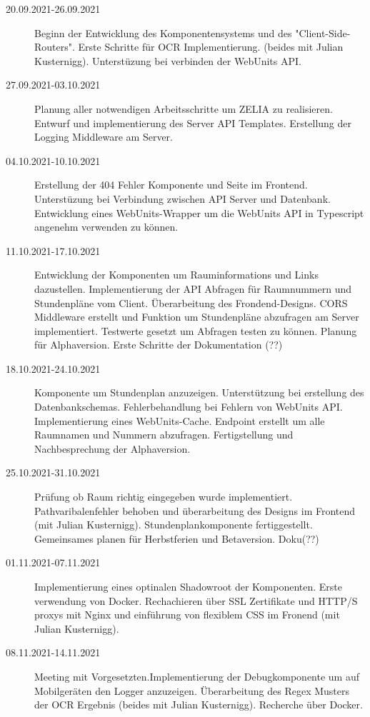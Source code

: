 
\begin{description}
    \item[20.09.2021-26.09.2021] Beginn der Entwicklung des Komponentensystems und des "Client-Side-Routers". Erste Schritte für OCR Implementierung. (beides mit Julian Kusternigg). Unterstüzung bei verbinden der WebUnits API.
    \item[27.09.2021-03.10.2021] Planung aller notwendigen Arbeitsschritte um ZELIA zu realisieren. Entwurf und implementierung des Server API Templates. Erstellung der Logging Middleware am Server.
    \item[04.10.2021-10.10.2021] Erstellung der 404 Fehler Komponente und Seite im Frontend. Unterstüzung bei Verbindung zwischen API Server und Datenbank. Entwicklung eines WebUnits-Wrapper um die WebUnits API in Typescript angenehm verwenden zu können.
    \item[11.10.2021-17.10.2021] Entwicklung der Komponenten um Rauminformations und Links dazustellen. Implementierung der API Abfragen für Raumnummern und Stundenpläne vom Client. Überarbeitung des Frondend-Designs. CORS Middleware erstellt und Funktion um Stundenpläne abzufragen am Server implementiert. Testwerte gesetzt um Abfragen testen zu können. Planung für Alphaversion. Erste Schritte der Dokumentation (??)
    \item[18.10.2021-24.10.2021] Komponente um Stundenplan anzuzeigen. Unterstützung bei erstellung des Datenbankschemas. Fehlerbehandlung bei Fehlern von WebUnits API. Implementierung eines WebUnits-Cache. Endpoint erstellt um alle Raumnamen und Nummern abzufragen. Fertigstellung und Nachbesprechung der Alphaversion.
    \item[25.10.2021-31.10.2021] Prüfung ob Raum richtig eingegeben wurde implementiert. Pathvaribalenfehler behoben und überarbeitung des Designs im Frontend (mit Julian Kusternigg). Stundenplankomponente fertiggestellt. Gemeinsames planen für Herbstferien und Betaversion. Doku(??)
    \item[01.11.2021-07.11.2021] Implementierung eines optinalen Shadowroot der Komponenten. Erste verwendung von Docker. Rechachieren über SSL Zertifikate und HTTP/S proxys mit Nginx und einführung von flexiblem CSS im Fronend (mit Julian Kusternigg).
    \item[08.11.2021-14.11.2021] Meeting mit Vorgesetzten.Implementierung der Debugkomponente um auf Mobilgeräten den Logger anzuzeigen. Überarbeitung des Regex Musters der OCR Ergebnis (beides mit Julian Kusternigg). Recherche über Docker.

\end{description}
